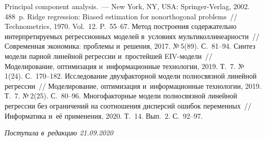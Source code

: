 \begin{multicols}{2}
{{\begin{thebibliography}{99}
 Principal component analysis.~--- New York, NY, USA: Springer-Verlag, 2002. 
488~p.
 Ridge regression: Biased estimation for nonorthogonal 
problems~// Technometrics, 1970. Vol.~12. P.~55--67.
 Метод построения содержательно 
интерпретируемых регрессионных моделей в~условиях мультиколлинеарности~// Современная 
экономика: проблемы и~решения, 2017. №\,5(89). С.~81--94.
 Синтез модели парной линейной регрессии и~простейшей  
EIV-мо\-де\-ли~// Моделирование, оптимизация и~информационные технологии, 2019. Т.~7. 
№\,1(24). С.~170--182.
 Исследование двухфакторной модели полносвязной линейной 
регрессии~// Моделирование, оптимизация и~информационные технологии, 2019. Т.~7. 
№\,2(25). С.~80--96.
 Многофакторные модели полносвязной линейной регрессии без 
ограничений на соотношения дисперсий ошибок переменных~// Информатика и~её применения, 
2020. Т.~14. Вып.~2. С.~92--97.
 \end{thebibliography}

}
}

\end{multicols}

\vspace*{-3pt}

\hfill{\small\textit{Поступила в~редакцию 21.09.2020}}



\newpage

\vspace*{-28pt}





\def\tit{METHOD OF STRAIGHTENING DISTORTED DUE~TO~MULTICOLLINEARITY 
COEFFICIENTS\\ IN~REGRESSION MODELS}


\def\titkol{Method of straightening distorted due~to~multicollinearity 
coefficients in~regression models}

\def\aut{M.\,P.~Bazilevskiy}

\def\autkol{M.\,P.~Bazilevskiy}


